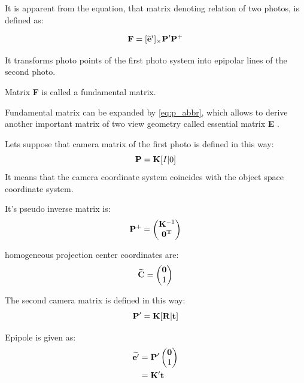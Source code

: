 \documentclass[a4paper,12pt]{article}
\newcommand{\ematr}[1]{
{\bf #1}
}
\newcommand{\evect}[1]{
{\bf #1}
}
\newcommand{\ehvect}[1]{
{\bf \widetilde{#1}}
}
\begin{document}


It is apparent from the equation, that matrix denoting relation of two photos, is defined as:

\begin{equation}
\ematr{F}  = [\ehvect{e}']_{\times} \ematr{P'}\ematr{P}^{+}
\end{equation}

It transforms photo points of the first photo system into 
epipolar lines of the second photo.


Matrix \ematr{F} is called a fundamental matrix. 

Fundamental matrix can be expanded by \eqref{eq:p_abbr}, which
allows to derive another important matrix of two view geometry called essential matrix \ematr{E}.

Lets suppose that camera matrix of the first photo is defined in this way:
\begin{equation}
\label{eq:rel_or_cam1}
\ematr{P}  = \ematr{K} \ematr{[}I|0\ematr{]}
\end{equation}
It means that the camera coordinate system coincides with  the object space coordinate 
system.

It's pseudo inverse matrix is:
\begin{equation}
\ematr{P}^{+} =
\begin{pmatrix}
   \ematr{K}^{-1} \\
   \evect{0^{T}} \\
\end{pmatrix}
\end{equation}

homogeneous projection center coordinates are:
\begin{equation}
\ehvect{C} =
\begin{pmatrix}
   \evect{0} \\
    1 \\
\end{pmatrix}
\end{equation}

The second camera matrix is defined in this way:
\begin{equation}
\label{eq:rel_or_cam2}
\ematr{P}'  = \ematr{K} \ematr{[}\ematr{R}|\evect{t}\ematr{]}
\end{equation}


Epipole is given as:
\begin{equation}
\begin{split}
\label{eg:second_epipole}
\ehvect{e'} &=  \ematr{P'}
\begin{pmatrix}
   \evect{0} \\
    1 \\
\end{pmatrix} \\
&= \ematr{K}' \evect{t}\\
\end{split}
\end{equation}
\end{document}

